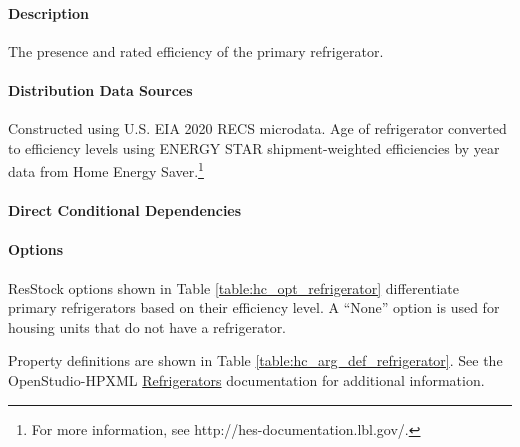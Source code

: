 \paragraph{Description}
% 
The presence and rated efficiency of the primary refrigerator.

\paragraph{Distribution Data Sources}
% 
Constructed using U.S. EIA 2020 RECS microdata. Age of refrigerator converted to efficiency levels using ENERGY STAR shipment-weighted efficiencies by year data from Home Energy Saver.\footnote{For more information, see http://hes-documentation.lbl.gov/.} 

\paragraph{Direct Conditional Dependencies}


\paragraph{Options}
ResStock options shown in Table \ref{table:hc_opt_refrigerator} differentiate primary refrigerators based on their efficiency level. A ``None'' option is used for housing units that do not have a refrigerator.



Property definitions are shown in Table \ref{table:hc_arg_def_refrigerator}. See the OpenStudio-HPXML \href{https://openstudio-hpxml.readthedocs.io/en/v1.10.0/workflow_inputs.html#hpxml-refrigerators}{Refrigerators} documentation for additional information.



